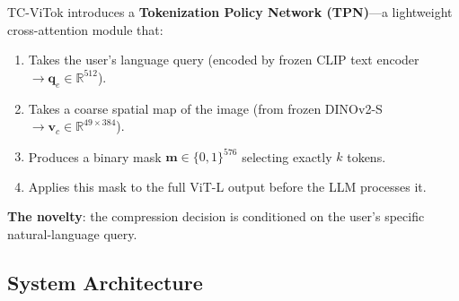 \documentclass[11pt,a4paper]{article}
\newcommand{\R}{\mathbb{R}}
\newcommand{\vc}{\mathbf{v}_c}
\newcommand{\qe}{\mathbf{q}_e}
\newcommand{\vm}{\mathbf{m}}
\begin{document}
TC-ViTok introduces a \textbf{Tokenization Policy Network (TPN)}---a
lightweight cross-attention module that:
\begin{enumerate}[leftmargin=1.5em, itemsep=2pt]
  \item Takes the user's language query (encoded by frozen CLIP text
    encoder $\to \qe \in \R^{512}$).
  \item Takes a coarse spatial map of the image (from frozen DINOv2-S
    $\to \vc \in \R^{49 \times 384}$).
  \item Produces a binary mask
    $\vm \in \{0,1\}^{576}$ selecting exactly $k$ tokens.
  \item Applies this mask to the full ViT-L output before the LLM
    processes it.
\end{enumerate}

\textbf{The novelty}: the compression decision is conditioned on the
user's specific natural-language query.

\subsection{System Architecture}
\end{document}
